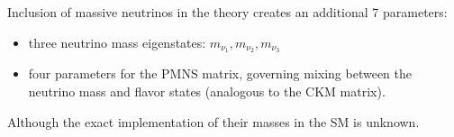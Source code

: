 Inclusion of massive neutrinos in the theory creates an additional 7 parameters:
\begin{itemize}
\item three neutrino mass eigenstates: $m_{\nu_{1}}, m_{\nu_{2}}, m_{\nu_{3}}$
\item four parameters for the PMNS matrix, governing mixing between the neutrino mass and flavor states (analogous to the CKM matrix).
\end{itemize}
Although the exact implementation of their masses in the SM is unknown.
